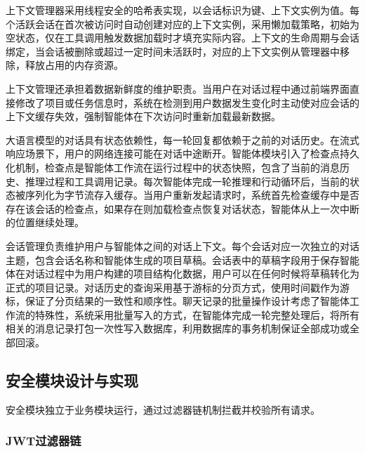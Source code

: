 \par 上下文管理器采用线程安全的哈希表实现，以会话标识为键、上下文实例为值。每个活跃会话在首次被访问时自动创建对应的上下文实例，采用懒加载策略，初始为空状态，仅在工具调用触发数据加载时才填充实际内容。上下文的生命周期与会话绑定，当会话被删除或超过一定时间未活跃时，对应的上下文实例从管理器中移除，释放占用的内存资源。

\par 上下文管理还承担着数据新鲜度的维护职责。当用户在对话过程中通过前端界面直接修改了项目或任务信息时，系统在检测到用户数据发生变化时主动使对应会话的上下文缓存失效，强制智能体在下次访问时重新加载最新数据。

\par 大语言模型的对话具有状态依赖性，每一轮回复都依赖于之前的对话历史。在流式响应场景下，用户的网络连接可能在对话中途断开。智能体模块引入了检查点持久化机制，检查点是智能体工作流在运行过程中的状态快照，包含了当前的消息历史、推理过程和工具调用记录。每次智能体完成一轮推理和行动循环后，当前的状态被序列化为字节流存入缓存。当用户重新发起请求时，系统首先检查缓存中是否存在该会话的检查点，如果存在则加载检查点恢复对话状态，智能体从上一次中断的位置继续处理。

\par 会话管理负责维护用户与智能体之间的对话上下文。每个会话对应一次独立的对话主题，包含会话名称和智能体生成的项目草稿。会话表中的草稿字段用于保存智能体在对话过程中为用户构建的项目结构化数据，用户可以在任何时候将草稿转化为正式的项目记录。对话历史的查询采用基于游标的分页方式，使用时间戳作为游标，保证了分页结果的一致性和顺序性。聊天记录的批量操作设计考虑了智能体工作流的特殊性，系统采用批量写入的方式，在智能体完成一轮完整处理后，将所有相关的消息记录打包一次性写入数据库，利用数据库的事务机制保证全部成功或全部回滚。


\subsection{安全模块设计与实现}

\par 安全模块独立于业务模块运行，通过过滤器链机制拦截并校验所有请求。

\subsubsection{JWT过滤器链}

